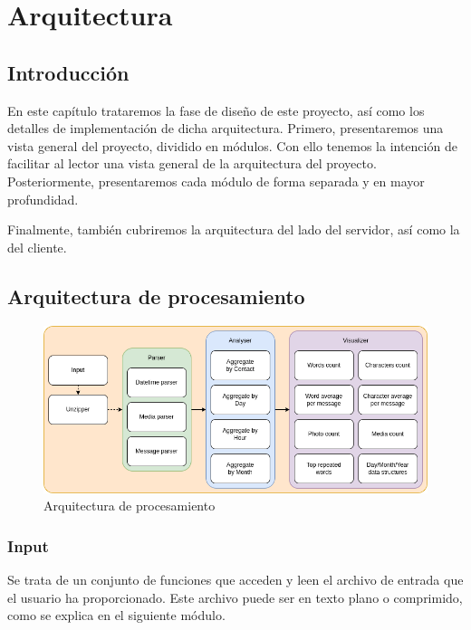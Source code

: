 \chapter{Arquitectura}
\label{chap:architecture}


\section{Introducción}
\label{sec:introduction}

En este capítulo trataremos la fase de diseño de este proyecto, así como los detalles de implementación de dicha arquitectura. Primero, presentaremos una vista general del proyecto, dividido en módulos. Con ello tenemos la intención de facilitar al lector una vista general de la arquitectura del proyecto. Posteriormente, presentaremos cada módulo de forma separada y en mayor profundidad.

Finalmente, también cubriremos la arquitectura del lado del servidor, así como la del cliente.

\section{Arquitectura de procesamiento}

\begin{figure}[H]
	\centering
	\includegraphics[width=\textwidth]{img/architecture_processing.png}
	\caption{Arquitectura de procesamiento}
	\label{fig:chap4:architecture_processing}
\end{figure}

\subsection{Input}

Se trata de un conjunto de funciones que acceden y leen el archivo de entrada que el usuario ha proporcionado. Este archivo puede ser en texto plano o comprimido, como se explica en el siguiente módulo.

